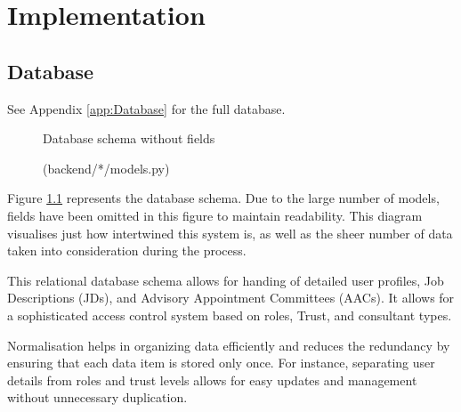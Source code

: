 \chapter{Implementation}
\section{Database} \label{Database}
\vspace{-5pt}
{\footnotesize See Appendix \ref{app:Database} for the full database.}
\vspace{-5pt}
\begin{figure}[h]
\centering
{}
\vspace{-20pt}
\caption{Database schema without fields}
\vspace{-10pt}
\caption*{(backend/*/models.py)}
\label{fig:database}
\vspace{-20pt}
\end{figure}

Figure \ref{fig:database} represents the database schema. Due to the large number of models, fields have been omitted in this figure to maintain readability. This diagram visualises just how intertwined this system is, as well as the sheer number of data taken into consideration during the process.

This relational database schema allows for handing of detailed user profiles, Job Descriptions (JDs), and Advisory Appointment Committees (AACs). It allows for a sophisticated access control system based on roles, Trust, and consultant types. 

Normalisation helps in organizing data efficiently and reduces the redundancy by ensuring that each data item is stored only once. For instance, separating user details from roles and trust levels allows for easy updates and management without unnecessary duplication. 

